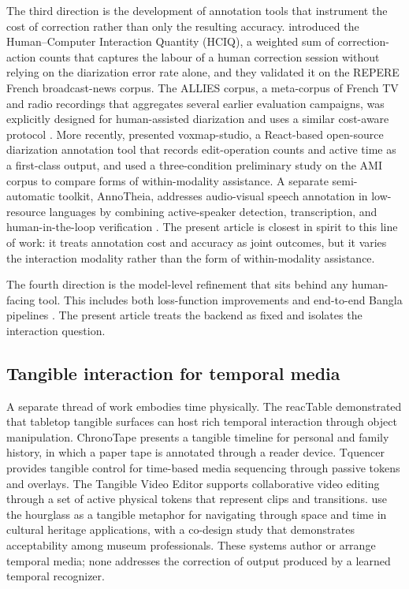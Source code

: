 \documentclass[10pt,a4paper,twocolumn]{article}
\begin{document}
The third direction is the development of annotation tools that
instrument the cost of correction rather than only the resulting
accuracy. \citet{broux2018cassid} introduced the Human--Computer
Interaction Quantity (HCIQ), a weighted sum of correction-action
counts that captures the labour of a human correction session
without relying on the diarization error rate alone, and they
validated it on the REPERE French broadcast-news corpus. The
ALLIES corpus, a meta-corpus of French TV and radio recordings
that aggregates several earlier evaluation campaigns, was
explicitly designed for human-assisted diarization and uses a
similar cost-aware protocol \citep{tahon2024allies}. More
recently, \citet{yamaguchi2026voxmap} presented
voxmap-studio, a React-based open-source diarization annotation
tool that records edit-operation counts and active time as a
first-class output, and used a three-condition preliminary
study on the AMI corpus to compare forms of within-modality
assistance. A separate semi-automatic toolkit, AnnoTheia,
addresses audio-visual speech annotation in low-resource
languages by combining active-speaker detection,
transcription, and human-in-the-loop verification
\citep{acosta2024annotheia}. The present article is closest in
spirit to this line of work: it treats annotation cost and
accuracy as joint outcomes, but it varies the interaction
modality rather than the form of within-modality assistance.

The fourth direction is the model-level refinement that sits
behind any human-facing tool. This includes both loss-function
improvements \citep{plaquet2023powerset} and end-to-end Bangla
pipelines \citep{bhuiyan2026banglawsd}. The present article
treats the backend as fixed and isolates the interaction
question.

\subsection{Tangible interaction for temporal media}
\label{sec:lit-temporal-tui}

A separate thread of work embodies time physically. The reacTable
\citep{jorda2007reactable} demonstrated that tabletop tangible
surfaces can host rich temporal interaction through object
manipulation. ChronoTape \citep{bennett2012chronotape} presents a
tangible timeline for personal and family history, in which a
paper tape is annotated through a reader device. Tquencer
\citep{kaltenbrunner2018tquencer} provides tangible control for
time-based media sequencing through passive tokens and overlays.
The Tangible Video Editor \citep{zigelbaum2007tve} supports
collaborative video editing through a set of active physical
tokens that represent clips and transitions.
\citet{mahieux2022sablier} use the hourglass as a tangible
metaphor for navigating through space and time in cultural
heritage applications, with a co-design study that demonstrates
acceptability among museum professionals. These systems author
or arrange temporal media; none addresses the correction of
output produced by a learned temporal recognizer.
\end{document}
